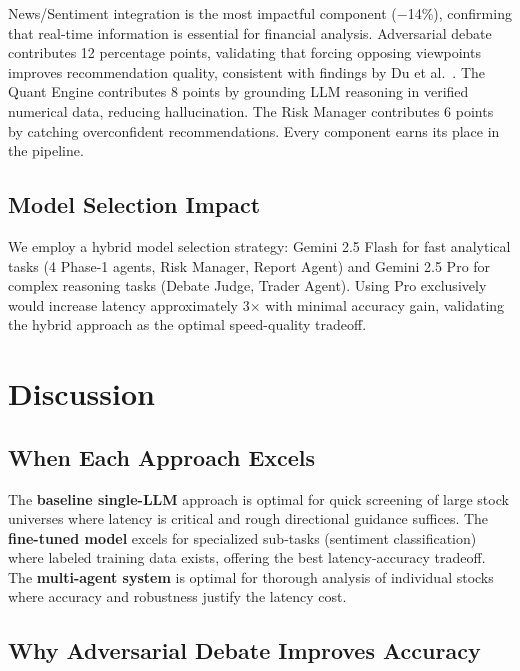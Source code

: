 \documentclass[conference]{IEEEtran}
\begin{document}
News/Sentiment integration is the most impactful component ($-$14\%), confirming that real-time information is essential for financial analysis. Adversarial debate contributes 12 percentage points, validating that forcing opposing viewpoints improves recommendation quality, consistent with findings by Du et al.~\cite{du2023debate}. The Quant Engine contributes 8 points by grounding LLM reasoning in verified numerical data, reducing hallucination. The Risk Manager contributes 6 points by catching overconfident recommendations. Every component earns its place in the pipeline.

\subsection{Model Selection Impact}

We employ a hybrid model selection strategy: Gemini 2.5 Flash for fast analytical tasks (4 Phase-1 agents, Risk Manager, Report Agent) and Gemini 2.5 Pro for complex reasoning tasks (Debate Judge, Trader Agent). Using Pro exclusively would increase latency approximately 3$\times$ with minimal accuracy gain, validating the hybrid approach as the optimal speed-quality tradeoff.


\section{Discussion}
\label{sec:discussion}

\subsection{When Each Approach Excels}

The \textbf{baseline single-LLM} approach is optimal for quick screening of large stock universes where latency is critical and rough directional guidance suffices. The \textbf{fine-tuned model} excels for specialized sub-tasks (sentiment classification) where labeled training data exists, offering the best latency-accuracy tradeoff. The \textbf{multi-agent system} is optimal for thorough analysis of individual stocks where accuracy and robustness justify the latency cost.

\subsection{Why Adversarial Debate Improves Accuracy}
\end{document}
